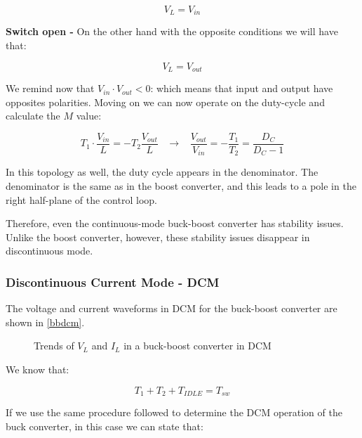 \documentclass[../main.tex]{subfiles}
\begin{document}
\begin{equation}
	V_L = V_{in}
\end{equation}

\textbf{Switch open -} On the other hand with the opposite conditions we will have that:

\begin{equation}
	V_{L} = V_{out}
\end{equation}

We remind now that $V_{in} \cdot V_{out} < 0$: which means that input and output have opposites polarities.
Moving on we can now operate on the duty-cycle and calculate the $M$ value:

\begin{equation}
	T_1 \cdot \frac{V_{in}}{L} = -T_2 \frac{V_{out}}{L} \hspace{10pt} \longrightarrow \hspace{10pt} \frac{V_{out}}{V_{in}} = - \frac{T_1}{T_2} = \frac{D_C}{D_C - 1}
\end{equation}

In this topology as well, the duty cycle appears in the denominator. The denominator is the same as in the boost converter, and this leads to a pole in the right half-plane of the control loop. 

Therefore, even the continuous-mode buck-boost converter has stability issues. Unlike the boost converter, however, these stability issues disappear in discontinuous mode.

\subsubsection*{Discontinuous Current Mode - DCM}


The voltage and current waveforms in DCM for the buck-boost converter are shown in \autoref{bbdcm}.

\begin{figure}[h!]
\begin{center}


\label{bbdcm}
\caption{Trends of $V_L$ and $I_L$ in a buck-boost converter in DCM}	
\end{center}
\end{figure}


We know that:

\begin{equation}
	T_1 + T_2 + T_{IDLE} = T_{sw}
\end{equation}

If we use the same procedure followed to determine the DCM operation of the buck converter, in this case we can state that:
\end{document}
